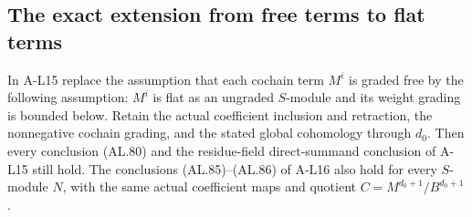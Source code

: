 \subsection{The exact extension from free terms to flat terms}

\begin{proposition}
\label{AL18}
In A-L15 replace the assumption that each cochain term
$M^i$ is graded free by the following assumption:
$M^i$ is flat as an ungraded $S$-module and its weight
grading is bounded below. Retain the actual coefficient
inclusion and retraction, the nonnegative cochain
grading, and the stated global cohomology through $d_0$.
Then every conclusion (AL.80) and the residue-field
direct-summand conclusion of A-L15 still hold.
The conclusions (AL.85)--(AL.86) of A-L16 also hold
for every $S$-module $N$, with the same actual
coefficient maps and quotient
$C=M^{d_0+1}/B^{d_0+1}$.
\end{proposition}

